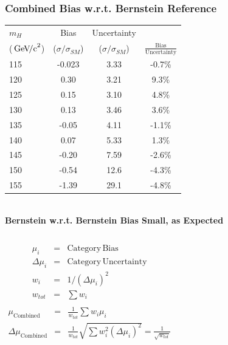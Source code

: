 \documentclass{beamer}
\newcommand{\GeVcc}{\ensuremath{\,\mathrm{Ge\kern -0.1em V\!/c}^2}}
\begin{document}
\begin{frame}
\frametitle{Combined Bias w.r.t. Bernstein Reference}
  \begin{center}
    \scriptsize
    \begin{tabular}{|l|c|c|c|} \hline
$m_H$         & Bias & Uncertainty & \\ 
(\GeVcc{})         & ($\sigma/\sigma_{SM}$) & ($\sigma/\sigma_{SM}$) & $\frac{\mathrm{Bias}}{\mathrm{Uncertainty}}$ \\ \hline \hline
115   &      -0.023 &   3.33 &      -0.7\%     \\ \hline
120   &       0.30  &   3.21 &       9.3\%     \\ \hline
125   &       0.15  &   3.10 &       4.8\%     \\ \hline
130   &       0.13  &   3.46 &       3.6\%     \\ \hline
135   &      -0.05  &   4.11 &      -1.1\%     \\ \hline
140   &       0.07  &   5.33 &       1.3\%     \\ \hline
145   &      -0.20  &   7.59 &      -2.6\%     \\ \hline
150   &      -0.54  &  12.6  &      -4.3\%     \\ \hline
155   &      -1.39  &  29.1  &      -4.8\%     \\ \hline
    \end{tabular}
\\ \vspace{1ex}
\normalsize
\textbf{Bernstein w.r.t. Bernstein Bias Small, as Expected}
  \end{center}
  \begin{columns}[c]
     \column{55mm}
    \scriptsize
    \begin{eqnarray*}
      \mu_i &=& \mathrm{Category\,Bias} \\
      \Delta\mu_i &=& \mathrm{Category\,Uncertainty} \\
      w_i &=& 1/(\Delta\mu_i)^2 \\
      w_{tot} &=& \sum w_i \\
    \end{eqnarray*}
     \column{65mm}
        \scriptsize
    \begin{eqnarray*}
      \mu_{\mathrm{Combined}} &=& \frac{1}{w_{tot}} \sum w_i \mu_i \\
      \Delta\mu_{\mathrm{Combined}} &=& \frac{1}{w_{tot}} \sqrt{\sum w_i^2 (\Delta\mu_i)^2} = \frac{1}{\sqrt{w_{tot}}}
    \end{eqnarray*}
  \end{columns}
\end{frame}
\end{document}
